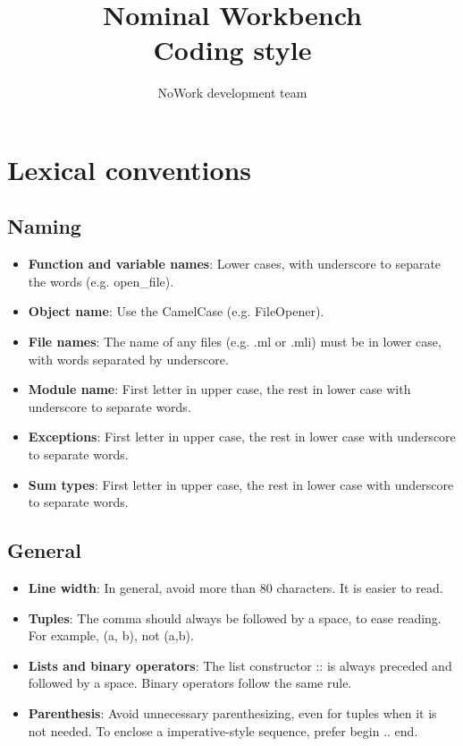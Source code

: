 \documentclass[12pt,a4paper]{article}
\title{Nominal Workbench \\
  Coding style}
\author{NoWork development team}
\begin{document}
\maketitle

\section{Lexical conventions}

\subsection{Naming}

\medskip

\begin{itemize}
\item \textbf{Function and variable names}: Lower cases, with underscore to 
  separate the words (e.g. open\_file).
\item \textbf{Object name}: Use the CamelCase (e.g. FileOpener).
\item \textbf{File names}: The name of any files (e.g. .ml or .mli) must be in
  lower case, with words separated by underscore.
\item \textbf{Module name}: First letter in upper case, the rest in lower case
  with underscore to separate words.
\item \textbf{Exceptions}: First letter in upper case, the rest in
  lower case with underscore to separate words.
\item \textbf{Sum types}: First letter in upper case, the rest in lower case
  with underscore to separate words.
\end{itemize}

\subsection{General}

\medskip 

\begin{itemize}
\item \textbf{Line width}: In general, avoid more than 80 characters. It is
  easier to read.
\item \textbf{Tuples}: The comma should always be followed by a space, to ease
  reading. For example, \textsf{(a, b)}, not \textsf{(a,b)}.
\item \textbf{Lists and binary operators}: The list constructor \textsf{::} is
  always preceded and followed by a space. Binary operators follow the same
  rule.
\item \textbf{Parenthesis}: Avoid unnecessary parenthesizing, even for tuples when
  it is not needed. To enclose a imperative-style sequence, prefer \textsf{begin
    .. end}.
\end{itemize}
\end{document}
